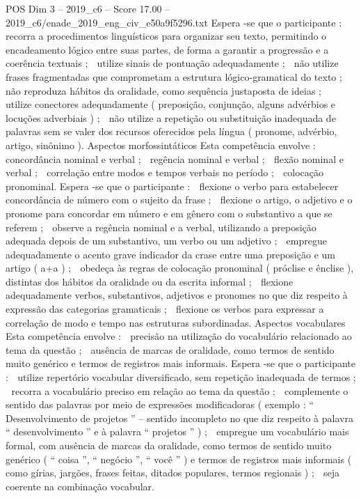 \begin{textsample}{POS Dim 3 – 2019\_c6 – Score 17.00 – 2019\_c6/enade\_2019\_eng\_civ\_e50a9f5296.txt}
Espera -se que o participante :  recorra a procedimentos linguísticos para organizar seu texto, permitindo o encadeamento lógico entre suas partes, de forma a garantir a progressão e a coerência textuais ;  utilize sinais de pontuação adequadamente ;  não utilize frases fragmentadas que comprometam a estrutura lógico-gramatical do texto ;  não reproduza hábitos da oralidade, como sequência justaposta de ideias ;  utilize conectores adequadamente ( preposição, conjunção, alguns advérbios e locuções adverbiais ) ;  não utilize a repetição ou substituição inadequada de palavras sem se valer dos recursos oferecidos pela língua ( pronome, advérbio, artigo, sinônimo ).
Aspectos morfossintáticos Esta competência envolve :  concordância nominal e verbal ;  regência nominal e verbal ;  flexão nominal e verbal ;  correlação entre modos e tempos verbais no período ;  colocação pronominal.
Espera -se que o participante :  flexione o verbo para estabelecer concordância de número com o sujeito da frase ;  flexione o artigo, o adjetivo e o pronome para concordar em número e em gênero com o substantivo a que se referem ;  observe a regência nominal e a verbal, utilizando a preposição adequada depois de um substantivo, um verbo ou um adjetivo ;  empregue adequadamente o acento grave indicador da crase entre uma preposição e um artigo ( a+a ) ;  obedeça às regras de colocação pronominal ( próclise e ênclise ), distintas dos hábitos da oralidade ou da escrita informal ;  flexione adequadamente verbos, substantivos, adjetivos e pronomes no que diz respeito à expressão das categorias gramaticais ;  flexione os verbos para expressar a correlação de modo e tempo nas estruturas subordinadas.
Aspectos vocabulares Esta competência envolve :  precisão na utilização do vocabulário relacionado ao tema da questão ;  ausência de marcas de oralidade, como termos de sentido muito genérico e termos de registros mais informais.
Espera -se que o participante :  utilize repertório vocabular diversificado, sem repetição inadequada de termos ;  recorra a vocabulário preciso em relação ao tema da questão ;  complemente o sentido das palavras por meio de expressões modificadoras ( exemplo : “ Desenvolvimento de projetos ” – sentido incompleto no que diz respeito à palavra “ desenvolvimento ” e à palavra “ projetos ” ) ;  empregue um vocabulário mais formal, com ausência de marcas da oralidade, como termos de sentido muito genérico ( “ coisa ”, “ negócio ”, “ você ” ) e termos de registros mais informais ( como gírias, jargões, frases feitas, ditados populares, termos regionais ) ;  seja coerente na combinação vocabular.

\end{textsample}
